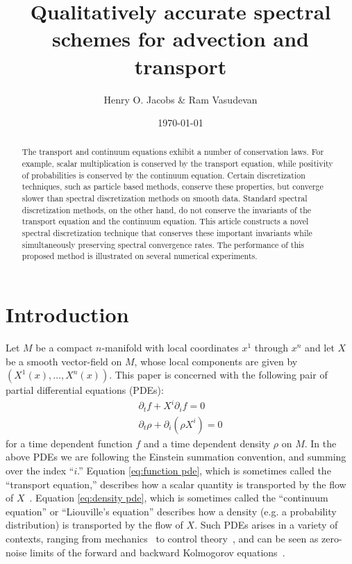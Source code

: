 \documentclass[final,leqno]{siamart}
\title{Qualitatively accurate spectral schemes for advection and transport}
\author{Henry O. Jacobs \& Ram Vasudevan}
\date{\today}
\begin{document}
\maketitle

\begin{abstract}
	The transport and continuum equations exhibit a number of conservation laws.
	For example, scalar multiplication is conserved by the transport equation, while
	positivity of probabilities is conserved by the continuum equation.
	Certain discretization techniques, such as particle based methods, conserve these properties, but converge slower than spectral discretization methods on smooth data.
	Standard spectral discretization methods, on the other hand, do not conserve the invariants of the transport equation and the continuum equation.
	This article constructs a novel spectral discretization technique that conserves these important invariants while simultaneously preserving spectral convergence rates. 
	The performance of this proposed method is illustrated on several numerical experiments. 
\end{abstract}

\section{Introduction}
\label{sec:intro}

Let $M$ be a compact $n$-manifold with local coordinates $x^{1}$ through $x^{n}$
and let $X$ be a smooth vector-field on $M$, whose local components are given by $(X^{1}(x), \dots, X^{n}(x) )$. 
This paper is concerned with the following pair of partial differential equations (PDEs):
\begin{align}
	\partial_{t} f + X^{i} \partial_{i} f = 0 \label{eq:function pde} \\
	\partial_{t} \rho + \partial_{i} (\rho X^{i}) = 0 \label{eq:density pde}
\end{align}
for a time dependent function $f$ and a time dependent density $\rho$ on $M$.
In the above PDEs we are following the Einstein summation convention, and summing over the index ``$i$.''
Equation \eqref{eq:function pde}, which is sometimes called the ``transport equation,'' describes how a scalar quantity is transported by the flow of $X$~\cite{Truesdell1991}.
Equation \eqref{eq:density pde}, which is sometimes called the ``continuum equation'' or ``Liouville's equation'' describes how a density (e.g. a probability distribution) is transported by the flow of $X$.
Such PDEs arises in a variety of contexts, ranging from  mechanics~\cite{Batchelor1999,Truesdell1991} to control theory~\cite{HenrionKorda2014}, and can be seen as zero-noise limits of the forward and backward Kolmogorov equations~\cite{Oksendal2003}.
\end{document}
